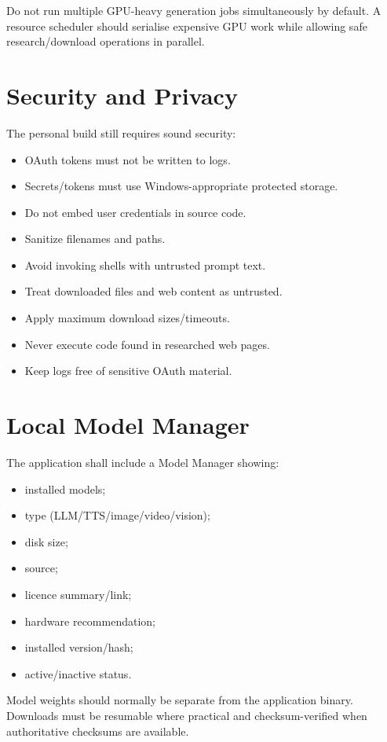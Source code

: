 \documentclass[10pt,journal,compsoc]{IEEEtran}
\begin{document}
Do not run multiple GPU-heavy generation jobs simultaneously by default. A resource scheduler should serialise expensive GPU work while allowing safe research/download operations in parallel.

\section{Security and Privacy}

The personal build still requires sound security:
\begin{itemize}
    \item OAuth tokens must not be written to logs.
    \item Secrets/tokens must use Windows-appropriate protected storage.
    \item Do not embed user credentials in source code.
    \item Sanitize filenames and paths.
    \item Avoid invoking shells with untrusted prompt text.
    \item Treat downloaded files and web content as untrusted.
    \item Apply maximum download sizes/timeouts.
    \item Never execute code found in researched web pages.
    \item Keep logs free of sensitive OAuth material.
\end{itemize}

\section{Local Model Manager}

The application shall include a Model Manager showing:
\begin{itemize}
    \item installed models;
    \item type (LLM/TTS/image/video/vision);
    \item disk size;
    \item source;
    \item licence summary/link;
    \item hardware recommendation;
    \item installed version/hash;
    \item active/inactive status.
\end{itemize}

Model weights should normally be separate from the application binary. Downloads must be resumable where practical and checksum-verified when authoritative checksums are available.
\end{document}
